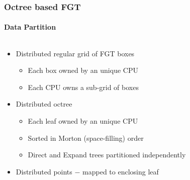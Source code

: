 \begin{frame}
\frametitle{Octree based FGT}
\framesubtitle{Data Partition}
\begin{columns}[T]
\begin{column}{0.6\textwidth}
\begin{itemize}
\item Distributed regular grid of FGT boxes
\begin{itemize}
\item Each box owned by an unique CPU
\item Each CPU owns a sub-grid of boxes
\newline
\end{itemize}
\item Distributed octree
\begin{itemize}
\item Each leaf owned by an unique CPU
\item Sorted in Morton (space-filling) order
\item Direct and Expand trees partitioned independently
\newline
\end{itemize}
\item Distributed points $-$ mapped to enclosing leaf
\end{itemize}
\end{column}
\begin{column}{0.4\textwidth}

\newline
%

\end{column}
\end{columns}
\end{frame}


